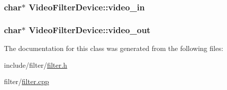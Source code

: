\subsubsection[{\texorpdfstring{video\+\_\+in}{video_in}}]{\setlength{\rightskip}{0pt plus 5cm}char$\ast$ Video\+Filter\+Device\+::video\+\_\+in\hspace{0.3cm}{\ttfamily [protected]}}\hypertarget{classVideoFilterDevice_a18807d5cf55aa13b649b827bab0a23b6}{}\label{classVideoFilterDevice_a18807d5cf55aa13b649b827bab0a23b6}
\subsubsection[{\texorpdfstring{video\+\_\+out}{video_out}}]{\setlength{\rightskip}{0pt plus 5cm}char$\ast$ Video\+Filter\+Device\+::video\+\_\+out\hspace{0.3cm}{\ttfamily [protected]}}\hypertarget{classVideoFilterDevice_a0d4cbcef5b18d44e313e72c019567e0c}{}\label{classVideoFilterDevice_a0d4cbcef5b18d44e313e72c019567e0c}


The documentation for this class was generated from the following files\+:\begin{DoxyCompactItemize}
\item 
include/filter/\hyperlink{filter_8h}{filter.\+h}\item 
filter/\hyperlink{filter_8cpp}{filter.\+cpp}\end{DoxyCompactItemize}
